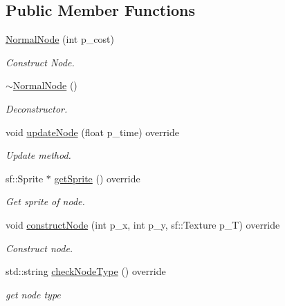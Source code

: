 \subsection*{Public Member Functions}
\begin{DoxyCompactItemize}
\item 
\mbox{\label{class_normal_node_a98d7475e5063b8ead0e0a15f7c0cdeef}} 
\mbox{\hyperlink{class_normal_node_a98d7475e5063b8ead0e0a15f7c0cdeef}{Normal\+Node}} (int p\+\_\+cost)
\begin{DoxyCompactList}\small\item\em Construct Node. \end{DoxyCompactList}\item 
\mbox{\hyperlink{class_normal_node_a0a046b69544c8cc7e352dca9b5837b76}{$\sim$\+Normal\+Node}} ()
\begin{DoxyCompactList}\small\item\em Deconstructor. \end{DoxyCompactList}\item 
\mbox{\label{class_normal_node_a4a846f6117353fe7483e1348a4da6e1f}} 
void \mbox{\hyperlink{class_normal_node_a4a846f6117353fe7483e1348a4da6e1f}{update\+Node}} (float p\+\_\+time) override
\begin{DoxyCompactList}\small\item\em Update method. \end{DoxyCompactList}\item 
sf\+::\+Sprite $\ast$ \mbox{\hyperlink{class_normal_node_aa5b5cb046635230adf5356e8bd0a61c2}{get\+Sprite}} () override
\begin{DoxyCompactList}\small\item\em Get sprite of node. \end{DoxyCompactList}\item 
\mbox{\label{class_normal_node_a7b75fb9660c92491bb797b030538c8f5}} 
void \mbox{\hyperlink{class_normal_node_a7b75fb9660c92491bb797b030538c8f5}{construct\+Node}} (int p\+\_\+x, int p\+\_\+y, sf\+::\+Texture p\+\_\+T) override
\begin{DoxyCompactList}\small\item\em Construct node. \end{DoxyCompactList}\item 
\mbox{\label{class_normal_node_aa11cbf32f7395ce3fd01113942c6351f}} 
std\+::string \mbox{\hyperlink{class_normal_node_aa11cbf32f7395ce3fd01113942c6351f}{check\+Node\+Type}} () override
\begin{DoxyCompactList}\small\item\em get node type \end{DoxyCompactList}\end{DoxyCompactItemize}

